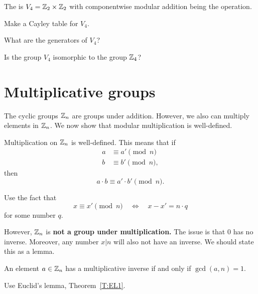 \documentclass{ximera}
\begin{document}
\begin{definition}
  The  is $V_4 = \mathbb Z_2\times\mathbb Z_2$ with
  componentwise modular addition being the operation.
\end{definition}

\begin{exercise}
  Make a Cayley table for $V_4$.
\end{exercise}

\begin{exercise}
  What are the generators of $V_4$?
\end{exercise}

\begin{exercise}
  Is the group $V_4$ isomorphic to the group $\mathbb Z_4$?
\end{exercise}



\section{Multiplicative groups}


The cyclic groups $\mathbb Z_n$ are groups under addition. However, we also
can multiply elements in $\mathbb Z_n$. We now show that modular
multiplication is well-defined.

\begin{lemma}\label{L:mmwd}
  Multiplication on $\mathbb Z_n$ is well-defined. This means that if
  \begin{align*}
    a &\equiv a' \pmod{n}\\
    b &\equiv b' \pmod{n},
  \end{align*}
  then
  \[
  a\cdot b \equiv a'\cdot b' \pmod{n}.
  \]
  \begin{sketch}
    Use the fact that
    \[
    x \equiv x'\pmod{n} \quad \Leftrightarrow \quad x -x' = n\cdot q
    \]
    for some number $q$.
  \end{sketch}
\end{lemma}

However, $\mathbb Z_n$ is \textbf{not a group under multiplication.} The
issue is that $0$ has no inverse. Moreover, any number $x|n$ will also
not have an inverse. We should state this as a lemma.

\begin{lemma}\label{L:mi}
  An element $a\in\mathbb Z_n$ has a multiplicative inverse if and only if
  $\gcd(a,n) = 1$.
  \begin{sketch}
    Use Euclid's lemma, Theorem~\ref{T:EL1}.
  \end{sketch}
\end{lemma}
\end{document}
